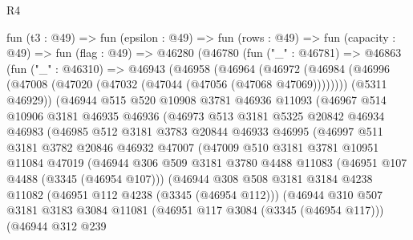 \begin{lexlean}{R4}
\begin{coremodule}
  fun (t3 : @49) =>
  fun (epsilon : @49) =>
  fun (rows : @49) =>
  fun (capacity : @49) =>
  fun (flag : @49) =>
  @46280
    (@46780
      (fun ("_" : @46781) =>
      @46863
        (fun ("_" : @46310) =>
        @46943
          (@46958
            (@46964
              (@46972
                (@46984 (@46996 (@47008 (@47020 (@47032 (@47044 (@47056 (@47068 @47069))))))))
                (@5311 @46929))
              (@46944
                @515
                @520
                @10908
                @3781
                @46936
                @11093
                (@46967
                  @514
                  @10906
                  @3181
                  @46935
                  @46936
                  (@46973
                    @513
                    @3181
                    @5325
                    @20842
                    @46934
                    @46983
                    (@46985
                      @512
                      @3181
                      @3783
                      @20844
                      @46933
                      @46995
                      (@46997
                        @511
                        @3181
                        @3782
                        @20846
                        @46932
                        @47007
                        (@47009
                          @510
                          @3181
                          @3781
                          @10951
                          @11084
                          @47019
                          (@46944
                            @306
                            @509
                            @3181
                            @3780
                            @4488
                            @11083
                            (@46951 @107 @4488 (@3345 (@46954 @107)))
                            (@46944
                              @308
                              @508
                              @3181
                              @3184
                              @4238
                              @11082
                              (@46951 @112 @4238 (@3345 (@46954 @112)))
                              (@46944
                                @310
                                @507
                                @3181
                                @3183
                                @3084
                                @11081
                                (@46951 @117 @3084 (@3345 (@46954 @117)))
                                (@46944
                                  @312
                                  @239

\end{coremodule}
\end{lexlean}
